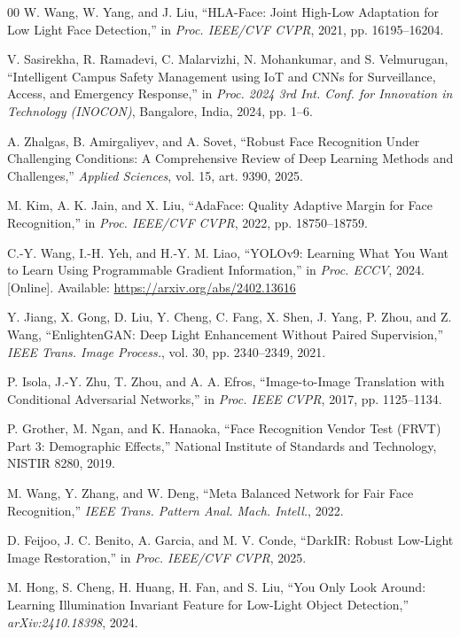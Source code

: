 \documentclass[conference]{IEEEtran}
\begin{document}
\begin{thebibliography}{00}
W. Wang, W. Yang, and J. Liu, ``HLA-Face: Joint High-Low
Adaptation for Low Light Face Detection,'' in \textit{Proc.
IEEE/CVF CVPR}, 2021, pp. 16195--16204.

V. Sasirekha, R. Ramadevi, C. Malarvizhi, N. Mohankumar, and S.
Velmurugan, ``Intelligent Campus Safety Management using IoT and
CNNs for Surveillance, Access, and Emergency Response,'' in
\textit{Proc. 2024 3rd Int. Conf. for Innovation in Technology
(INOCON)}, Bangalore, India, 2024, pp. 1--6.

A. Zhalgas, B. Amirgaliyev, and A. Sovet, ``Robust Face
Recognition Under Challenging Conditions: A Comprehensive Review
of Deep Learning Methods and Challenges,'' \textit{Applied
Sciences}, vol. 15, art. 9390, 2025.

M. Kim, A. K. Jain, and X. Liu, ``AdaFace: Quality Adaptive
Margin for Face Recognition,'' in \textit{Proc. IEEE/CVF CVPR},
2022, pp. 18750--18759.

C.-Y. Wang, I.-H. Yeh, and H.-Y. M. Liao, ``YOLOv9: Learning What
You Want to Learn Using Programmable Gradient Information,'' in
\textit{Proc. ECCV}, 2024. [Online]. Available:
\url{https://arxiv.org/abs/2402.13616}

Y. Jiang, X. Gong, D. Liu, Y. Cheng, C. Fang, X. Shen, J. Yang,
P. Zhou, and Z. Wang, ``EnlightenGAN: Deep Light Enhancement
Without Paired Supervision,'' \textit{IEEE Trans. Image Process.},
vol. 30, pp. 2340--2349, 2021.

P. Isola, J.-Y. Zhu, T. Zhou, and A. A. Efros, ``Image-to-Image
Translation with Conditional Adversarial Networks,'' in
\textit{Proc. IEEE CVPR}, 2017, pp. 1125--1134.

P. Grother, M. Ngan, and K. Hanaoka, ``Face Recognition Vendor
Test (FRVT) Part 3: Demographic Effects,'' National Institute of
Standards and Technology, NISTIR 8280, 2019.

M. Wang, Y. Zhang, and W. Deng, ``Meta Balanced Network for Fair
Face Recognition,'' \textit{IEEE Trans. Pattern Anal. Mach.
Intell.}, 2022.

D. Feijoo, J. C. Benito, A. Garcia, and M. V. Conde, ``DarkIR:
Robust Low-Light Image Restoration,'' in \textit{Proc. IEEE/CVF
CVPR}, 2025.

M. Hong, S. Cheng, H. Huang, H. Fan, and S. Liu, ``You Only Look
Around: Learning Illumination Invariant Feature for Low-Light
Object Detection,'' \textit{arXiv:2410.18398}, 2024.


\end{thebibliography}
\end{document}
